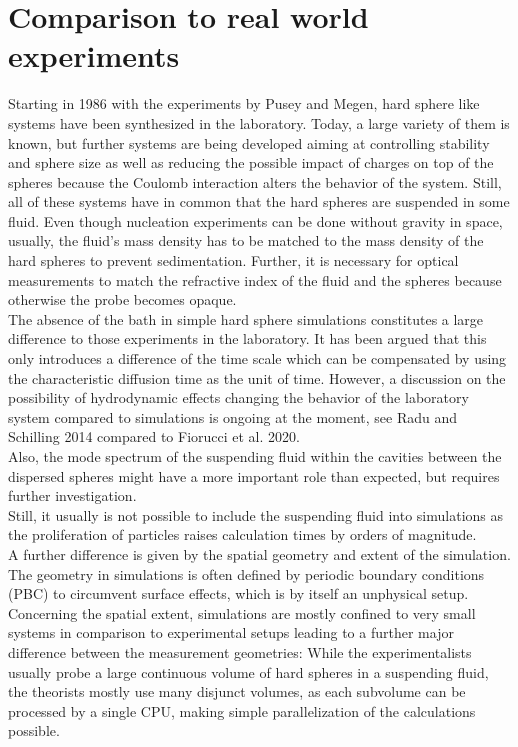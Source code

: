\section{Comparison to real world experiments} 
\label{sec:comparison}
Starting in 1986 with the experiments by Pusey and Megen\cite{Pusey1986}, hard sphere like systems have been synthesized in the laboratory. Today, a large variety of them is known, but further systems are being developed aiming at controlling stability and sphere size as well as reducing the possible impact of charges on top of the spheres because the Coulomb interaction alters the behavior of the system. Still, all of these systems have in common that the hard spheres are suspended in some fluid. Even though nucleation experiments can be done without gravity in space\cite{Doherty1998}, usually, the fluid's mass density has to be matched to the mass density of the hard spheres to prevent sedimentation. Further, it is necessary for optical measurements to match the refractive index of the fluid and the spheres because otherwise the probe becomes opaque.\\

The absence of the bath in simple hard sphere simulations constitutes a large difference to those experiments in the laboratory. It has been argued that this only introduces a difference of the time scale which can be compensated by using the characteristic diffusion time as the unit of time. However, a discussion on the possibility of hydrodynamic effects changing the behavior of the laboratory system compared to simulations is ongoing at the moment, see Radu and Schilling 2014\cite{Radu2014} compared to Fiorucci et al. 2020\cite{Fiorucci2020a}.\\
Also, the mode spectrum of the suspending fluid within the cavities between the dispersed spheres might have a more important role 
than expected, but requires further investigation.\\ 
Still, it usually is not possible to include the suspending fluid into simulations as the proliferation of particles raises calculation times by orders of magnitude.\\

A further difference is given by the spatial geometry and extent of the simulation. The geometry in simulations is often defined by periodic boundary conditions (PBC) to circumvent surface effects, which is by itself an unphysical setup.\\ 
Concerning the spatial extent, simulations are mostly confined to very small systems in comparison to experimental setups leading to a further major difference between the measurement geometries: While the experimentalists usually probe a large continuous volume of hard spheres in a suspending fluid, the theorists mostly use many disjunct volumes, as each subvolume can be processed by a single CPU, making simple parallelization of the calculations possible.\\

